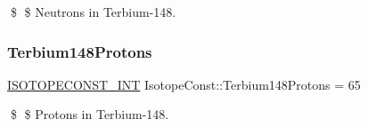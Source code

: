 \$ \$ Neutrons in Terbium-\/148. \mbox{\label{group___isotope_const-_terbium-_tb148_ga3c5d5f0864f081d2137f2a0eaa69ec52}} 
\subsubsection{\texorpdfstring{Terbium148\+Protons}{Terbium148Protons}}
{\footnotesize\ttfamily \mbox{\hyperlink{group___isotope_const-_macros_ga5f18360b3e99483a35c32d789e62621c}{I\+S\+O\+T\+O\+P\+E\+C\+O\+N\+S\+T\+\_\+\+I\+NT}} Isotope\+Const\+::\+Terbium148\+Protons = 65}

\$ \$ Protons in Terbium-\/148. 